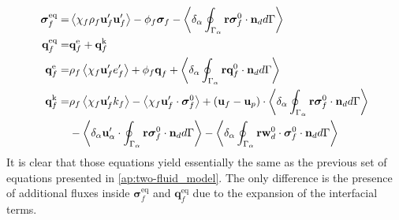 \begin{align}
    \label{eq:sigma_eq_def}
    \bm{\sigma}_f^\text{eq}
    =& 
    \avg{\chi_f\rho_f\textbf{u}_f'\textbf{u}_f'}
    - \phi_f \bm{\sigma}_f%
    - \pSavg{{\textbf{r}\bm{\sigma}_f^0 \cdot \textbf{n}_d}}\\
    \textbf{q}_f^\text{eq}
    =&\textbf{q}_f^\text{e} +\textbf{q}_f^\text{k}  \nonumber\\
    \textbf{q}_f^\text{e}
    =& \rho_f \avg{\chi_f \textbf{u}_f' e_f'} 
    + \phi_f\textbf{q}_f 
    +\pSavg{{\textbf{r}\textbf{q}_f^0 \cdot \textbf{n}_d}} 
    \nonumber\\
    \textbf{q}_f^\text{k}
    =& \rho_f \avg{\chi_f \textbf{u}_f' k_f} 
    - \avg{\chi_f \textbf{u}_f' \cdot \bm{\sigma}_f^0}
    + (\textbf{u}_f - \textbf{u}_p)\cdot
    \pSavg{{\textbf{r}\bm{\sigma}_f^0 \cdot \textbf{n}_d}}
    \nonumber\\\nonumber&
    - \pavg{ \textbf{u}_\alpha' \cdot \intS{ \textbf{r} \bm{\sigma}_f^0 \cdot \textbf{n}_d}}
    - \pavg{ \intS{\textbf{r}\textbf{w}_d^0 \cdot \bm{\sigma}_f^0 \cdot \textbf{n}_d}}
\end{align}
It is clear that those equations yield essentially the same as the previous set of equations presented in \ref{ap:two-fluid_model}.
The only difference is the presence of additional fluxes inside $\bm{\sigma}^\text{eq}_f$ and $\textbf{q}^\text{eq}_f$ due to the expansion of the interfacial terms. 

